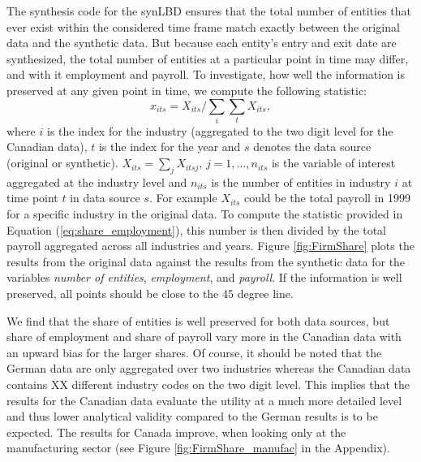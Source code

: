 The synthesis code for the synLBD ensures that the total number of entities that ever exist within the considered time frame  match exactly between the original data and the synthetic data. But because each entity's entry and exit date are synthesized, the total number of entities at a particular point in time may differ, and with it employment and payroll. To investigate, how well the information is preserved at any given point in time, we compute the following statistic:
\begin{equation}
    \label{eq:share_employment}
x_{its} = X_{its}/\sum_{i} \sum_{t} X_{its}, 
\end{equation}
where $i$ is the index for the industry (aggregated to the two digit level for the Canadian data), $t$ is the index for the year and $s$ denotes the data source (original or synthetic). $X_{its}=\sum_j X_{itsj}$, $j=1,\ldots,n_{its}$ is the variable of interest aggregated at the industry level and $n_{its}$ is the number of entities in industry $i$ at time point $t$ in data source $s$. For example $X_{its}$ could be the total payroll in 1999 for a specific industry in the original data. To compute the statistic provided in Equation (\ref{eq:share_employment}), this number is then divided by the total payroll aggregated across all industries and years.
Figure \ref{fig:FirmShare} plots the results from the original data against the results from the synthetic data for the variables \textit{number of entities}, \textit{employment}, and \textit{payroll}. If the information is well preserved, all points should be close to the 45 degree line. 

We find that the share of entities is well preserved for both data sources, but share of employment and share of payroll vary more in the Canadian data with an upward bias for the larger shares. Of course, it should be noted that the German data are only aggregated over two industries whereas the Canadian data contains XX different industry codes on the two digit level. This implies that the results for the Canadian data evaluate the utility at a much more detailed level and thus lower analytical validity compared to the German results is to be expected. The results for Canada improve, when looking only at the manufacturing sector (see Figure \ref{fig:FirmShare_manufac} in the Appendix).




